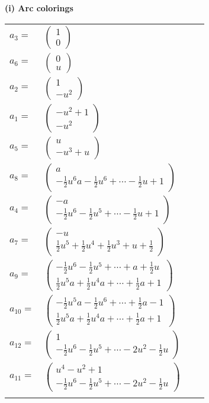\documentclass[1p]{elsarticle_modified}
\theoremstyle{definition}
\begin{document}
\flushleft \textbf{(i) Arc colorings}\\
\begin{tabular}{m{7pt} m{180pt} m{7pt} m{180pt} }
\flushright $a_{3}=$&$\begin{pmatrix}1\\0\end{pmatrix}$ \\
\flushright $a_{6}=$&$\begin{pmatrix}0\\u\end{pmatrix}$ \\
\flushright $a_{2}=$&$\begin{pmatrix}1\\- u^2\end{pmatrix}$ \\
\flushright $a_{1}=$&$\begin{pmatrix}- u^2+1\\- u^2\end{pmatrix}$ \\
\flushright $a_{5}=$&$\begin{pmatrix}u\\- u^3+u\end{pmatrix}$ \\
\flushright $a_{8}=$&$\begin{pmatrix}a\\-\frac{1}{2} u^6 a-\frac{1}{2} u^6+\cdots-\frac{1}{2} u+1\end{pmatrix}$ \\
\flushright $a_{4}=$&$\begin{pmatrix}- a\\-\frac{1}{2} u^6-\frac{1}{2} u^5+\cdots-\frac{1}{2} u+1\end{pmatrix}$ \\
\flushright $a_{7}=$&$\begin{pmatrix}- u\\\frac{1}{2} u^5+\frac{1}{2} u^4+\frac{1}{2} u^3+u+\frac{1}{2}\end{pmatrix}$ \\
\flushright $a_{9}=$&$\begin{pmatrix}-\frac{1}{2} u^6-\frac{1}{2} u^5+\cdots+a+\frac{1}{2} u\\\frac{1}{2} u^5 a+\frac{1}{2} u^4 a+\cdots+\frac{1}{2} a+1\end{pmatrix}$ \\
\flushright $a_{10}=$&$\begin{pmatrix}-\frac{1}{2} u^5 a-\frac{1}{2} u^6+\cdots+\frac{1}{2} a-1\\\frac{1}{2} u^5 a+\frac{1}{2} u^4 a+\cdots+\frac{1}{2} a+1\end{pmatrix}$ \\
\flushright $a_{12}=$&$\begin{pmatrix}1\\-\frac{1}{2} u^6-\frac{1}{2} u^5+\cdots-2 u^2-\frac{1}{2} u\end{pmatrix}$ \\
\flushright $a_{11}=$&$\begin{pmatrix}u^4- u^2+1\\-\frac{1}{2} u^6-\frac{1}{2} u^5+\cdots-2 u^2-\frac{1}{2} u\end{pmatrix}$\\&\end{tabular}
\end{document}
